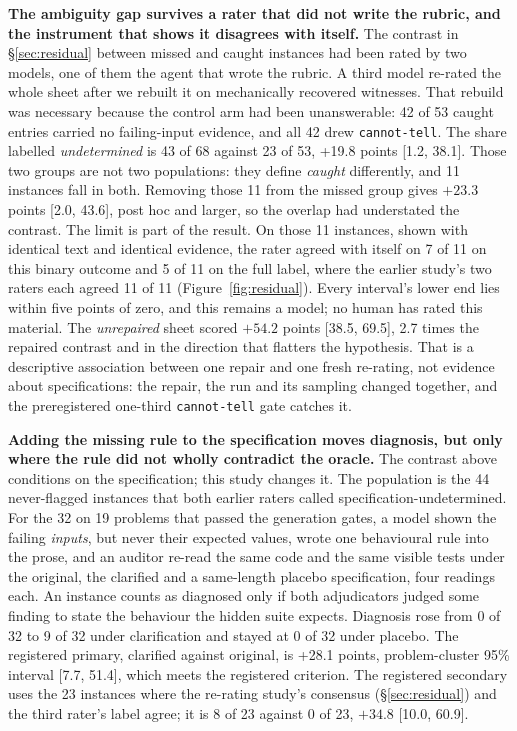\textbf{The ambiguity gap survives a rater that did not write the rubric, and the instrument that
shows it disagrees with itself.} The contrast in \S\ref{sec:residual} between missed and caught
instances had been rated by two models, one of them the agent that wrote the rubric. A third model
re-rated the whole sheet after we rebuilt it on mechanically recovered witnesses. That rebuild was
necessary because the control arm had been unanswerable: 42 of 53 caught entries carried no
failing-input evidence, and all 42 drew \texttt{cannot-tell}. The share labelled
\emph{undetermined} is 43 of 68 against 23 of 53, +19.8 points [1.2, 38.1]. Those two
groups are not two populations: they define \emph{caught} differently, and 11 instances fall in
both. Removing those 11 from the missed group gives $+23.3$ points [2.0, 43.6], post
hoc and larger, so the overlap had understated the contrast. The limit is part of the result. On
those 11 instances, shown with identical text and identical evidence, the rater agreed
with itself on 7 of 11 on this binary outcome and 5 of 11 on the full label, where the earlier
study's two raters each agreed 11 of 11 (Figure~\ref{fig:residual}). Every interval's lower end
lies within five points of zero, and this remains a model; no human has rated this material. The
\emph{unrepaired} sheet scored $+54.2$ points [38.5, 69.5], 2.7 times the repaired contrast
and in the direction that flatters the hypothesis. That is a descriptive association between one
repair and one fresh re-rating, not evidence about specifications: the repair, the run and its
sampling changed together, and the preregistered one-third \texttt{cannot-tell} gate catches it.

\textbf{Adding the missing rule to the specification moves diagnosis, but only where the rule
did not wholly contradict the oracle.} The contrast above conditions on the specification; this study changes it.
The population is the 44 never-flagged instances that both earlier raters called
specification-undetermined. For the 32 on 19 problems that passed the generation gates, a model
shown the failing \emph{inputs}, but never their expected values, wrote one behavioural rule into
the prose, and an auditor re-read the same code and the same visible tests under the original, the
clarified and a same-length placebo specification, four readings each. An instance counts as
diagnosed only if both adjudicators judged some finding to state the behaviour the hidden suite
expects. Diagnosis rose from 0 of 32 to 9 of 32 under clarification and stayed at 0 of 32
under placebo. The registered primary, clarified against original, is +28.1 points,
problem-cluster 95\% interval [7.7, 51.4], which meets the registered criterion. The registered
secondary uses the 23 instances where the re-rating study's consensus (\S\ref{sec:residual}) and
the third rater's label agree; it is 8 of 23 against 0 of 23, $+34.8$ [10.0, 60.9].

